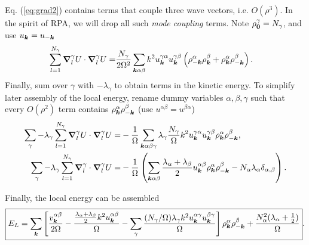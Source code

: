 Eq. (\ref{eq:grad2}) contains terms that couple three wave vectors, i.e. $O(\rho^3)$. In the spirit of RPA, we will drop all such \emph{mode coupling} terms. Note $\rho_{\boldsymbol{0}}^\gamma = N_\gamma$, and use $u_{\boldsymbol{k}}=u_{-\boldsymbol{k}}$
\begin{align}
\sum\limits_{l=1}^{N_\gamma}\boldsymbol{\nabla}_l^\gamma U\cdot\boldsymbol{\nabla}_l^\gamma U =&
\frac{N_\gamma}{2\Omega^2}\sum\limits_{\boldsymbol{k}\alpha\beta} k^2u_{\boldsymbol{k}}^{\gamma\alpha}u_{\boldsymbol{k}}^{\gamma\beta} \left( \rho_{-\boldsymbol{k}}^\alpha\rho_{\boldsymbol{k}}^\beta + \rho_{\boldsymbol{k}}^\alpha\rho_{-\boldsymbol{k}}^\beta \right). \label{eq:grad2_rpa}
\end{align}
Finally, sum over $\gamma$ with $-\lambda_\gamma$ to obtain terms in the kinetic energy. To simplify later assembly of the local energy, rename dummy variables $\alpha, \beta, \gamma$ such that every $O(\rho^2)$ term contains $\rho_{\boldsymbol{k}}^\alpha\rho_{-\boldsymbol{k}}^\beta$ (use $u^{\alpha\beta}=u^{\beta\alpha}$)
\begin{align}
\sum\limits_{\gamma}-\lambda_\gamma\sum\limits_{l=1}^{N_\gamma}\boldsymbol{\nabla}_l^\gamma U\cdot\boldsymbol{\nabla}_l^\gamma U =&-\frac{1}{\Omega}
\sum\limits_{\boldsymbol{k}\alpha\beta\gamma} \lambda_\gamma\frac{N_\gamma}{\Omega}
k^2u_{\boldsymbol{k}}^{\gamma\alpha}u_{\boldsymbol{k}}^{\gamma\beta} \rho_{\boldsymbol{k}}^\alpha\rho_{-\boldsymbol{k}}^\beta, \\
\sum\limits_{\gamma}-\lambda_\gamma\sum\limits_{l=1}^{N_\gamma}\boldsymbol{\nabla}_l^\gamma \cdot\boldsymbol{\nabla}_l^\gamma U =& -\frac{1}{\Omega}\left( 
\sum\limits_{\boldsymbol{k}\alpha\beta} \frac{\lambda_\alpha+\lambda_\beta}{2} u_{\boldsymbol{k}}^{\alpha\beta}\rho_{\boldsymbol{k}}^\alpha\rho_{-\boldsymbol{k}}^\beta -N_\alpha\lambda_\alpha\delta_{\alpha,\beta} \right).
\end{align}

Finally, the local energy can be assembled
\begin{align}
\boxed{E_L = \sum\limits_{\boldsymbol{k}}\left[\frac{v^{\alpha\beta}_{\boldsymbol{k}}}{2\Omega} - 
\frac{\frac{\lambda_\alpha+\lambda_\beta}{2}k^2u_{\boldsymbol{k}}^{\alpha\beta}}{\Omega} -
\sum\limits_\gamma \frac{(N_\gamma/\Omega)\lambda_\gamma k^2u_{\boldsymbol{k}}^{\alpha\gamma}u_{\boldsymbol{k}}^{\beta\gamma}}{\Omega}\right]\rho_{\boldsymbol{k}}^\alpha\rho_{-\boldsymbol{k}}^\beta + \frac{N_\alpha^2(\lambda_\alpha+\frac{1}{2})}{\Omega}}.
\end{align}

